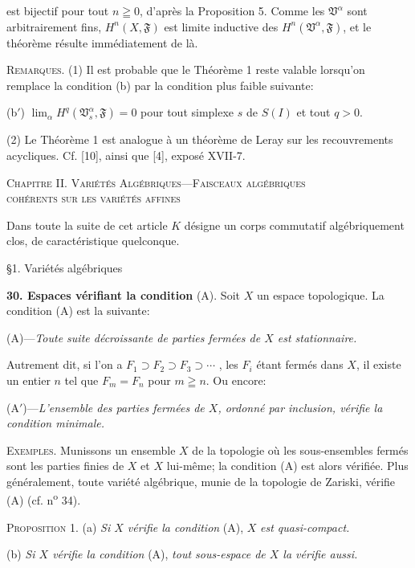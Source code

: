 est bijectif pour tout $n \geqq 0$, d'après la Proposition 5. Comme les $\mathfrak{V}^\alpha$ sont arbitrairement fins, $H^n(X, \mathfrak{F})$ est limite inductive des $H^n(\mathfrak{V}^\alpha, \mathfrak{F})$, et le théorème résulte immédiatement de là.

\textsc{Remarques}. (1) Il est probable que le Théorème 1 reste valable lorsqu'on remplace la condition (b) par la condition plus faible suivante:

(b$'$) $\lim_\alpha H^q(\mathfrak{V}^\alpha_s , \mathfrak{F}) = 0$ pour tout simplexe $s$ de $S(I)$ et tout $q > 0$.

(2) Le Théorème 1 est analogue à un théorème de Leray sur les recouvrements acycliques. Cf. [10], ainsi que [4], exposé XVII-7.

\begin{center}
\textsc{Chapitre} II. \textsc{Variétés Algébriques---Faisceaux algébriques}\\
\textsc{cohérents sur les variétés affines}
\end{center}

Dans toute la suite de cet article $K$ désigne un corps commutatif algébriquement clos, de caractéristique quelconque.




\S1. Variétés algébriques

\textbf{30. Espaces vérifiant la condition} (A). Soit $X$ un espace topologique. La condition (A) est la suivante:

(A)---\textit{Toute suite décroissante de parties fermées de $X$ est stationnaire.}

Autrement dit, si l'on a $F_1 \supset F_2 \supset F_3 \supset \cdots$ , les $F_i$ étant fermés dans $X$, il existe un entier $n$ tel que $F_m = F_n$ pour $m \geqq n$. Ou encore:

(A$'$)---\textit{L'ensemble des parties fermées de $X$, ordonné par inclusion, vérifie la condition minimale.}

\textsc{Exemples}. Munissons un ensemble $X$ de la topologie où les sous-ensembles fermés sont les parties finies de $X$ et $X$ lui-même; la condition (A) est alors vérifiée. Plus généralement, toute variété algébrique, munie de la topologie de Zariski, vérifie (A) (cf. n\textsuperscript{o} 34).

\textsc{Proposition} 1. (a) \textit{Si $X$ vérifie la condition} (A), $X$ \textit{est quasi-compact.}

(b) \textit{Si $X$ vérifie la condition} (A), \textit{tout sous-espace de $X$ la vérifie aussi.}

